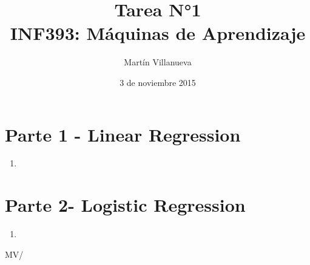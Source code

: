 \documentclass[spanish, fleqn]{article}
\title{Tarea N°1 \\INF393: Máquinas de Aprendizaje}
\author{Martín Villanueva}
\date{3 de noviembre 2015}
\begin{document}
\maketitle

\thispagestyle{empty}

\section*{Parte 1 - Linear Regression}

\begin{enumerate}
  \item
\end{enumerate}




\section*{Parte 2- Logistic Regression}

\begin{enumerate}
  \item
\end{enumerate}

\vfill\hfill MV/\LaTeXe
\end{document}
